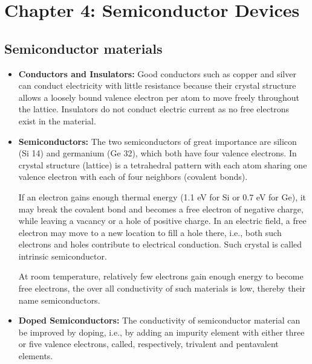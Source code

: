 \usepackage{html}
\textwidth 6.0in
\topmargin -0.5in
\oddsidemargin -0in
\evensidemargin -0.5in


\section*{Chapter 4: Semiconductor Devices}

\subsection*{Semiconductor materials}

\begin{itemize}
\item {\bf Conductors and Insulators:} 
Good conductors such as copper and silver can conduct electricity with
little resistance because their crystal structure allows a loosely
bound valence electron per atom to move freely throughout the lattice. 
Insulators do not conduct electric current as no free electrons exist
in the material.

\item {\bf Semiconductors:} 
The two semiconductors of great importance are silicon (Si 14) and 
germanium (Ge 32), which both have four valence electrons. In crystal
structure (lattice)  is a tetrahedral pattern with each atom sharing one 
valence electron with each of four neighbors (covalent bonds). 

If an electron gains enough thermal energy (1.1 eV for Si or 0.7 eV for
Ge), it may break the covalent bond and becomes a free electron of negative
charge, while leaving a vacancy or a hole of positive charge. In an electric
field, a free electron may move to a new location to fill a hole there, i.e.,
both such electrons and holes contribute to electrical conduction. Such 
crystal is called intrinsic semiconductor.

At room temperature, relatively few electrons gain enough energy to become
free electrons, the over all conductivity of such materials is low, thereby
their name semiconductors. 


\item {\bf Doped Semiconductors:}
The conductivity of semiconductor material can be improved by doping, i.e.,
by adding an impurity element with either three or five valence electrons,
called, respectively, trivalent and pentavalent elements. 


\end{itemize}
